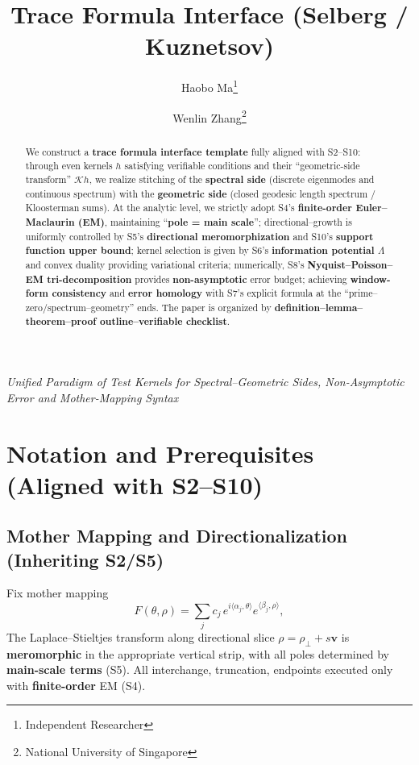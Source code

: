 \documentclass[11pt,a4paper]{article}
\title{Trace Formula Interface (Selberg / Kuznetsov)}
\author{Haobo Ma\thanks{Independent Researcher} \and Wenlin Zhang\thanks{National University of Singapore}}
\date{}
\theoremstyle{remark}
\begin{document}
\maketitle

\begin{center}
\textit{Unified Paradigm of Test Kernels for Spectral--Geometric Sides, Non-Asymptotic Error and Mother-Mapping Syntax}
\end{center}

\begin{abstract}
We construct a \textbf{trace formula interface template} fully aligned with S2--S10: through even kernels $h$ satisfying verifiable conditions and their ``geometric-side transform'' $\mathcal{K} h$, we realize stitching of the \textbf{spectral side} (discrete eigenmodes and continuous spectrum) with the \textbf{geometric side} (closed geodesic length spectrum / Kloosterman sums). At the analytic level, we strictly adopt S4's \textbf{finite-order Euler--Maclaurin (EM)}, maintaining ``\textbf{pole = main scale}''; directional--growth is uniformly controlled by S5's \textbf{directional meromorphization} and S10's \textbf{support function upper bound}; kernel selection is given by S6's \textbf{information potential $\Lambda$} and convex duality providing variational criteria; numerically, S8's \textbf{Nyquist--Poisson--EM tri-decomposition} provides \textbf{non-asymptotic} error budget; achieving \textbf{window-form consistency} and \textbf{error homology} with S7's explicit formula at the ``prime--zero/spectrum--geometry'' ends. The paper is organized by \textbf{definition--lemma--theorem--proof outline--verifiable checklist}.
\end{abstract}

\section{Notation and Prerequisites (Aligned with S2--S10)}

\subsection{Mother Mapping and Directionalization (Inheriting S2/S5)}

Fix mother mapping
\begin{equation}
F(\theta,\rho)=\sum_{j} c_j\,e^{i\langle\alpha_j,\theta\rangle} e^{\langle\beta_j,\rho\rangle},
\end{equation}
The Laplace--Stieltjes transform along directional slice $\rho=\rho_\perp+s\mathbf{v}$ is \textbf{meromorphic} in the appropriate vertical strip, with all poles determined by \textbf{main-scale terms} (S5). All interchange, truncation, endpoints executed only with \textbf{finite-order} EM (S4).
\end{document}
